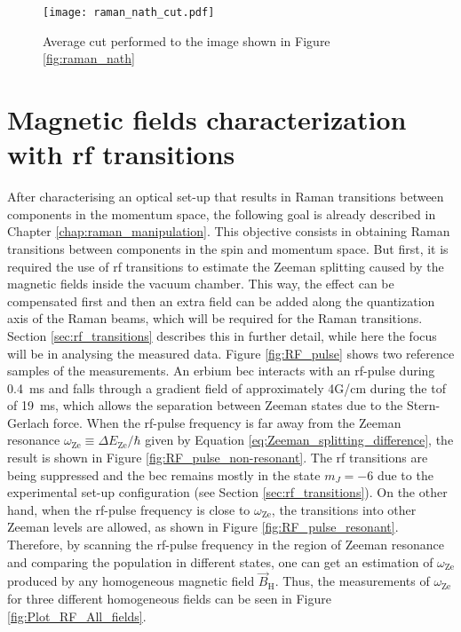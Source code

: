 \begin{figure}[!htbp]\centering
	\texttt{[image: raman\_nath\_cut.pdf]}
	\caption[Average cut performed to the image shown in Figure \ref{fig:raman_nath}]{Average cut performed to the image shown in Figure \ref{fig:raman_nath}}
\end{figure}

\pagebreak

\section{Magnetic fields characterization with \acs{rf} transitions}

After characterising an optical set-up that results in Raman transitions between components in the momentum space, the following goal is already described in Chapter \ref{chap:raman_manipulation}. This objective consists in obtaining Raman transitions between components in the spin and momentum space. But first, it is required the use of \ac{rf} transitions to estimate the Zeeman splitting caused by the magnetic fields inside the vacuum chamber. This way, the effect can be compensated first and then an extra field can be added along the quantization axis of the Raman beams, which will be required for the Raman transitions. Section \ref{sec:rf_transitions} describes this in further detail, while here the focus will be in analysing the measured data. Figure \ref{fig:RF_pulse} shows two reference samples of the measurements. An erbium \ac{bec} interacts with an \ac{rf}-pulse during \SI{0.4}{\milli\second} and falls through a gradient field of approximately 4G/cm during the \ac{tof} of \SI{19}{\milli\second}, which allows the separation between Zeeman states due to the Stern-Gerlach force. When the \ac{rf}-pulse frequency is far away from the Zeeman resonance $\omega_\text{Ze} \equiv \Delta E_{\text{Ze}}/\hbar$ given by Equation \ref{eq:Zeeman_splitting_difference}, the result is shown in Figure \ref{fig:RF_pulse_non-resonant}. The \ac{rf} transitions are being suppressed and the \ac{bec} remains mostly in the state $m_J=-6$ due to the experimental set-up configuration (see Section \ref{sec:rf_transitions}). On the other hand, when the \ac{rf}-pulse frequency is close to $\omega_\text{Ze}$, the transitions into other Zeeman levels are allowed, as shown in Figure \ref{fig:RF_pulse_resonant}. Therefore, by scanning the \ac{rf}-pulse frequency in the region of Zeeman resonance and comparing the population in different states, one can get an estimation of $\omega_\text{Ze}$ produced by any homogeneous magnetic field $\vec{B}_\text{H}$. Thus, the measurements of $\omega_\text{Ze}$ for three different homogeneous fields can be seen in Figure \ref{fig:Plot_RF_All_fields}.

